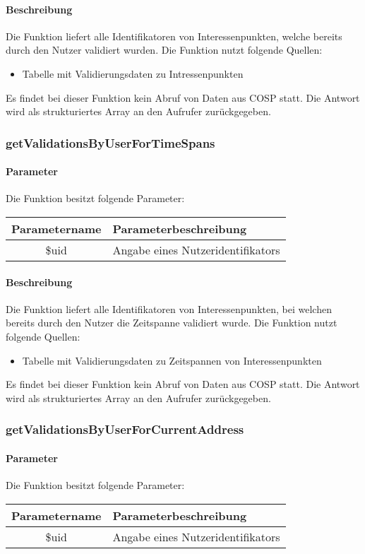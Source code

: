 \paragraph{Beschreibung} Die Funktion liefert alle Identifikatoren von Interessenpunkten, welche bereits durch den Nutzer validiert wurden. Die Funktion nutzt folgende Quellen:
\begin{itemize}
	\item Tabelle mit Validierungsdaten zu Intressenpunkten
\end{itemize}
Es findet bei dieser Funktion kein Abruf von Daten aus {\glqq COSP\grqq} statt. Die Antwort wird als strukturiertes Array an den Aufrufer zurückgegeben.
\subsubsection{getValidationsByUserForTimeSpans}
\paragraph{Parameter} Die Funktion besitzt folgende Parameter:
\begin{table}[H]
	\begin{tabular}{|c|p{11cm}|}
		\hline
		\textbf{Parametername} & \textbf{Parameterbeschreibung} \\ \hline
		\$uid & Angabe eines Nutzeridentifikators \\ \hline
	\end{tabular}
\end{table}
\paragraph{Beschreibung} Die Funktion liefert alle Identifikatoren von Interessenpunkten, bei welchen bereits durch den Nutzer die Zeitspanne validiert wurde. Die Funktion nutzt folgende Quellen:
\begin{itemize}
	\item Tabelle mit Validierungsdaten zu Zeitspannen von Interessenpunkten
\end{itemize}
Es findet bei dieser Funktion kein Abruf von Daten aus {\glqq COSP\grqq} statt. Die Antwort wird als strukturiertes Array an den Aufrufer zurückgegeben.
\subsubsection{getValidationsByUserForCurrentAddress}
\paragraph{Parameter} Die Funktion besitzt folgende Parameter:
\begin{table}[H]
	\begin{tabular}{|c|p{11cm}|}
		\hline
		\textbf{Parametername} & \textbf{Parameterbeschreibung} \\ \hline
		\$uid & Angabe eines Nutzeridentifikators \\ \hline
	\end{tabular}
\end{table}
